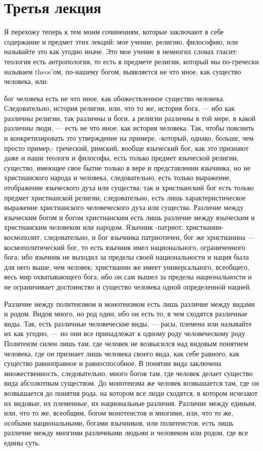 \documentclass[12pt]{article}
\begin{document}
\section*{Третья лекция}

Я перехожу теперь к тем моим сочинениям, которые заключают в себе содержание и предмет этих лекций: мое учение, религию, философию, или называйте это как угодно иначе. Это мое учение в немногих словах гласит: теология есть антропология, то есть в предмете религии, который мы по-гречески называем theos'ом, по-нашему богом, выявляется не что иное, как существо человека, или: 

бог человека есть не что иное, как обожествленное существо человека. Следовательно, история религии, или, что то же, история бога, --- ибо как различны религии, так различны и боги, а религии различны в той мере, в какой различны люди, --- есть не что иное, как история человека. Так, чтобы пояснить и конкретизировать это утверждение на примере, -который, однако, больше, чем просто пример,- греческий, римский, вообще языческий бог, как это признают даже и наши теологи и философы, есть только предмет языческой религии, существо, имеющее свое бытие только в вере и представлении язычника, но не христианского народа и человека, следовательно, есть только выражение, отображение языческого духа или существа; так и христианский бог есть только предмет христианской религии, следовательно, есть лишь характеристическое выражение христианского человеческого духа или существа. Различие между языческим богом и богом христианским есть лишь различие между языческим и христианским человеком или народом. Язычник -патриот, христианин- космополит, следовательно, и бог язычника патриотичен, бог же христианина --- космополитический бог, то есть язычник имел национального, ограниченного бога, ибо язычник не выходил за пределы своей национальности и нация была для него выше, чем человек; христианин же имеет универсального, всеобщего, весь мир охватывающего бога, ибо он сам вышел за пределы национальности и не ограничивает достоинство и существо человека одной определенной нацией. 

Различие между политеизмом и монотеизмом есть лишь различие между видами и родом. Видов много, но род один, ибо он есть то, в чем сходятся различные виды. Так, есть различные человеческие виды, --- расы, племена или называйте их как угодно, --- но они все принадлежат к одному роду человеческому роду. Политеизм силен лишь там, где человек не возвысился над видовым понятием человека, где он признает лишь человека своего вида, как себе равного, как существо равноправное и равноспособное. В понятии вида заключена множественность, следовательно, много богов там, где человек делает существо вида абсолютным существом. До монотеизма же человек возвышается там, где он возвышается до понятия рода, на котором все люди сходятся, в котором исчезают их видовые, их племенные, их национальные различия. Различие между единым, или, что то же, всеобщим, богом монотеистов и многими, или, что то же, особыми национальными, богами язычников, или политеистов, есть лишь различие между многими различными людьми и человеком или родом, где все едины суть. 
\end{document}
